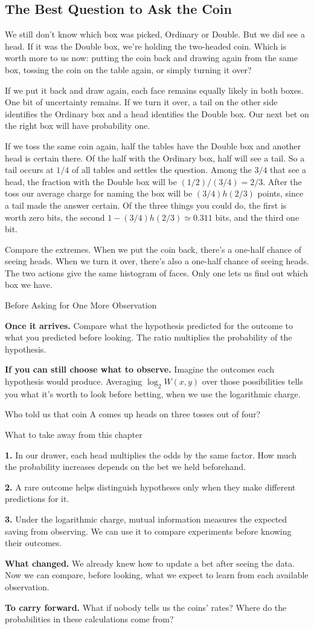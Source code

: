 \documentclass[12pt,oneside]{article}
\newcommand{\secao}[1]{\Needspace{5.2\baselineskip}\subsection*{#1}}
\newcommand{\itemq}[1]{\par\textbf{#1.}\enspace}
\begin{document}
\secao{The Best Question to Ask the Coin}
We still don't know which box was picked, Ordinary or Double. But we did see a head. If it was the Double box, we're holding the two-headed coin. Which is worth more to us now: putting the coin back and drawing again from the same box, tossing the coin on the table again, or simply turning it over?

If we put it back and draw again, each face remains equally likely in both boxes. One bit of uncertainty remains. If we turn it over, a tail on the other side identifies the Ordinary box and a head identifies the Double box. Our next bet on the right box will have probability one.

If we toss the same coin again, half the tables have the Double box and another head is certain there. Of the half with the Ordinary box, half will see a tail. So a tail occurs at $1/4$ of all tables and settles the question. Among the $3/4$ that see a head, the fraction with the Double box will be $(1/2)/(3/4)=2/3$. After the toss our average charge for naming the box will be $(3/4)h(2/3)$ points, since a tail made the answer certain. Of the three things you could do, the first is worth zero bits, the second $1-(3/4)h(2/3)\simeq0.311$ bits, and the third one bit.

Compare the extremes. When we put the coin back, there's a one-half chance of seeing heads. When we turn it over, there's also a one-half chance of seeing heads. The two actions give the same histogram of faces. Only one lets us find out which box we have.

\begin{quadro}{Before Asking for One More Observation}
\itemq{Once it arrives} Compare what the hypothesis predicted for the outcome to what you predicted before looking. The ratio multiplies the probability of the hypothesis.
\itemq{If you can still choose what to observe} Imagine the outcomes each hypothesis would produce. Averaging $\log_2 W(x,y)$ over those possibilities tells you what it's worth to look before betting, when we use the logarithmic charge.
\end{quadro}

Who told us that coin A comes up heads on three tosses out of four?

\begin{quadro}{What to take away from this chapter}
\itemq{1} In our drawer, each head multiplies the odds by the same factor. How much the probability increases depends on the bet we held beforehand.
\itemq{2} A rare outcome helps distinguish hypotheses only when they make different predictions for it.
\itemq{3} Under the logarithmic charge, mutual information measures the expected saving from observing. We can use it to compare experiments before knowing their outcomes.
\itemq{What changed} We already knew how to update a bet after seeing the data. Now we can compare, before looking, what we expect to learn from each available observation.
\itemq{To carry forward} What if nobody tells us the coins' rates? Where do the probabilities in these calculations come from?
\end{quadro}
\end{document}
